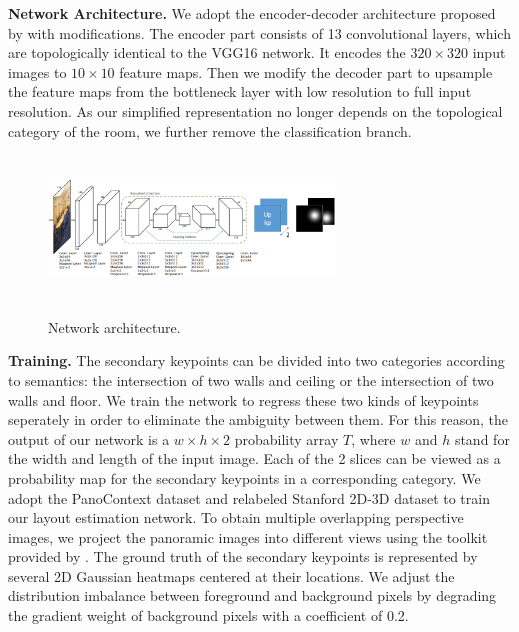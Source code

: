 
\noindent\textbf{Network Architecture.} We adopt the encoder-decoder architecture proposed by \cite{roomnet} with modifications. The encoder part consists of 13 convolutional layers, which are topologically identical to the VGG16 network. It encodes the $320\times320$ input images to $10\times10$ feature maps. Then we modify the decoder part to upsample the feature maps from the bottleneck layer with low resolution to full input resolution. As our simplified representation no longer depends on the topological category of the room, we further remove the classification branch. 

\begin{figure}
	\includegraphics[height=1.5in, width=3in]{figs/network.png}
	\label{fig:network}
	\caption{Network architecture.}
\end{figure}

\noindent\textbf{Training.} The secondary keypoints can be divided into two categories according to semantics: the intersection of two walls and ceiling or the intersection of two walls and floor. We train the network to regress these two kinds of keypoints seperately in order to eliminate the ambiguity between them. For this reason, the output of our network is a $w \times h \times 2$ probability array $T$, where $w$ and $h$ stand for the width and length of the input image. Each of the 2 slices can be viewed as a probability map for the secondary keypoints in a corresponding category. We adopt the PanoContext dataset \cite{pano} and relabeled Stanford 2D-3D dataset \cite{layoutnet} to train our layout estimation network. To obtain multiple overlapping perspective images, we project the panoramic images into different views using the toolkit provided by \cite{pano}. The ground truth of the secondary keypoints is represented by several 2D Gaussian heatmaps centered at their locations. We adjust the distribution imbalance between foreground and background pixels by degrading the gradient weight of background pixels with a coefficient of 0.2.

